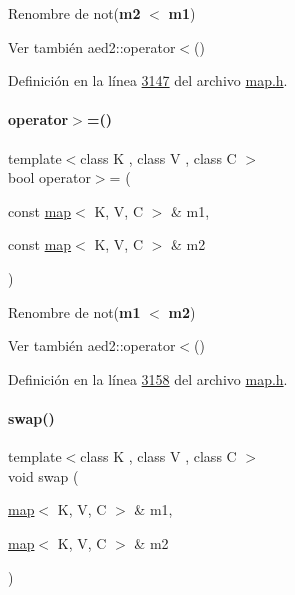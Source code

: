 Renombre de not({\bfseries m2} $<$ {\bfseries m1}) 

\begin{DoxySeeAlso}{Ver también}
aed2\+::operator$<$() 
\end{DoxySeeAlso}


Definición en la línea \hyperlink{map_8h_source_l03147}{3147} del archivo \hyperlink{map_8h_source}{map.\+h}.

\mbox{\label{classaed2_1_1map_a093a6d1a055339c5fc6297a1d47a9159_a093a6d1a055339c5fc6297a1d47a9159}} 
\paragraph{\texorpdfstring{operator$>$=()}{operator>=()}}
{\footnotesize\ttfamily template$<$class K , class V , class C $>$ \\
bool operator$>$= (\begin{DoxyParamCaption}\item[{const \hyperlink{classaed2_1_1map}{map}$<$ K, V, C $>$ \&}]{m1,  }\item[{const \hyperlink{classaed2_1_1map}{map}$<$ K, V, C $>$ \&}]{m2 }\end{DoxyParamCaption})\hspace{0.3cm}{\ttfamily [related]}}



Renombre de not({\bfseries m1} $<$ {\bfseries m2}) 

\begin{DoxySeeAlso}{Ver también}
aed2\+::operator$<$() 
\end{DoxySeeAlso}


Definición en la línea \hyperlink{map_8h_source_l03158}{3158} del archivo \hyperlink{map_8h_source}{map.\+h}.

\mbox{\label{classaed2_1_1map_a119cb2938bbc11c25ebd4fb824782a72_a119cb2938bbc11c25ebd4fb824782a72}} 
\paragraph{\texorpdfstring{swap()}{swap()}}
{\footnotesize\ttfamily template$<$class K , class V , class C $>$ \\
void swap (\begin{DoxyParamCaption}\item[{\hyperlink{classaed2_1_1map}{map}$<$ K, V, C $>$ \&}]{m1,  }\item[{\hyperlink{classaed2_1_1map}{map}$<$ K, V, C $>$ \&}]{m2 }\end{DoxyParamCaption})\hspace{0.3cm}{\ttfamily [related]}}



